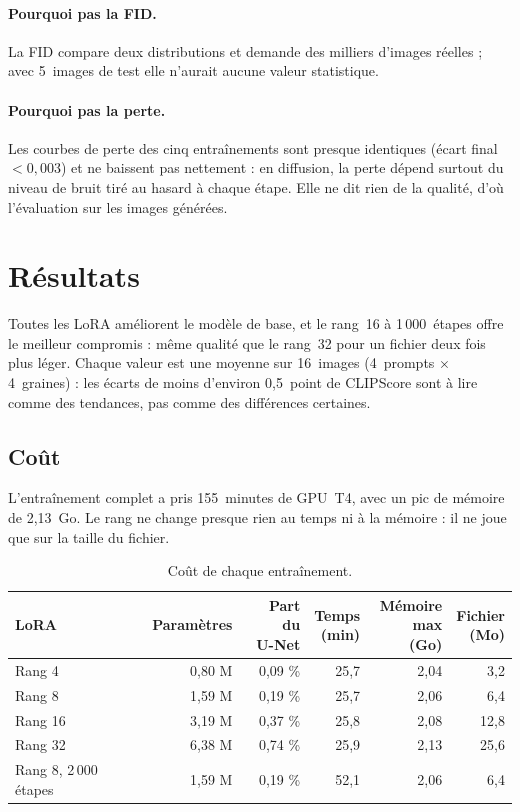 \documentclass[11pt,a4paper]{article}
\begin{document}
\paragraph{Pourquoi pas la FID.} La FID compare deux distributions et demande des milliers d'images réelles ; avec 5~images de test elle n'aurait aucune valeur statistique.

\paragraph{Pourquoi pas la perte.} Les courbes de perte des cinq entraînements sont presque identiques (écart final $< 0{,}003$) et ne baissent pas nettement : en diffusion, la perte dépend surtout du niveau de bruit tiré au hasard à chaque étape. Elle ne dit rien de la qualité, d'où l'évaluation sur les images générées.

\section{Résultats}

Toutes les LoRA améliorent le modèle de base, et le rang~16 à 1\,000~étapes offre le meilleur compromis : même qualité que le rang~32 pour un fichier deux fois plus léger. Chaque valeur est une moyenne sur 16~images (4~prompts $\times$ 4~graines) : les écarts de moins d'environ 0,5~point de CLIPScore sont à lire comme des tendances, pas comme des différences certaines.

\subsection{Coût}

L'entraînement complet a pris 155~minutes de GPU~T4, avec un pic de mémoire de 2,13~Go. Le rang ne change presque rien au temps ni à la mémoire : il ne joue que sur la taille du fichier.

\begin{table}[H]
  \centering
  \caption{Coût de chaque entraînement.}
  \small
  \begin{tabular}{lrrrrr}
    \toprule
    LoRA & Paramètres & \shortstack[r]{Part du\\U-Net} & \shortstack[r]{Temps\\(min)} & \shortstack[r]{Mémoire\\max (Go)} & \shortstack[r]{Fichier\\(Mo)} \\
    \midrule
    Rang 4 & 0,80 M & 0,09 \% & 25,7 & 2,04 & 3,2 \\
    Rang 8 & 1,59 M & 0,19 \% & 25,7 & 2,06 & 6,4 \\
    \rowcolor{bleu!10} Rang 16 & 3,19 M & 0,37 \% & 25,8 & 2,08 & 12,8 \\
    Rang 32 & 6,38 M & 0,74 \% & 25,9 & 2,13 & 25,6 \\
    Rang 8, 2\,000 étapes & 1,59 M & 0,19 \% & 52,1 & 2,06 & 6,4 \\
    \bottomrule
  \end{tabular}
\end{table}
\end{document}
